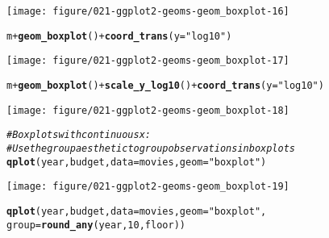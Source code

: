 \documentclass[a4paper,titlepage]{tufte-handout}\usepackage[]{graphicx}\usepackage[]{color}
\makeatletter
\def\maxwidth{ %
  \ifdim\Gin@nat@width>\linewidth
    \linewidth
  \else
    \Gin@nat@width
  \fi
}
\newcommand{\hlnum}[1]{\textcolor[rgb]{0.686,0.059,0.569}{#1}}%
\newcommand{\hlstr}[1]{\textcolor[rgb]{0.192,0.494,0.8}{#1}}%
\newcommand{\hlcom}[1]{\textcolor[rgb]{0.678,0.584,0.686}{\textit{#1}}}%
\newcommand{\hlopt}[1]{\textcolor[rgb]{0,0,0}{#1}}%
\newcommand{\hlstd}[1]{\textcolor[rgb]{0.345,0.345,0.345}{#1}}%
\newcommand{\hlkwc}[1]{\textcolor[rgb]{0.333,0.667,0.333}{#1}}%
\newcommand{\hlkwd}[1]{\textcolor[rgb]{0.737,0.353,0.396}{\textbf{#1}}}%
\newenvironment{kframe}{%
 \def\at@end@of@kframe{}%
 \ifinner\ifhmode%
  \def\at@end@of@kframe{\end{minipage}}%
  \begin{minipage}{\columnwidth}%
 \fi\fi%
 \def\FrameCommand##1{\hskip\@totalleftmargin \hskip-\fboxsep
 \colorbox{shadecolor}{##1}\hskip-\fboxsep
     \hskip-\linewidth \hskip-\@totalleftmargin \hskip\columnwidth}%
 \MakeFramed {\advance\hsize-\width
   \@totalleftmargin\z@ \linewidth\hsize
   \@setminipage}}%
 {\par\unskip\endMakeFramed%
 \at@end@of@kframe}
\newenvironment{knitrout}{}{} %
\makeatother
\begin{document}
\begin{knitrout}
\begin{kframe}
{\ttfamily\noindent\color{warningcolor}{\#\# Warning in loop\_apply(n, do.ply): position\_dodge requires constant width: output may be incorrect}}\end{kframe}
\texttt{[image: figure/021-ggplot2-geoms-geom\_boxplot-16]} 
\begin{kframe}\begin{alltt}
\hlstd{m} \hlopt{+} \hlkwd{geom_boxplot}\hlstd{()} \hlopt{+} \hlkwd{coord_trans}\hlstd{(}\hlkwc{y} \hlstd{=} \hlstr{"log10"}\hlstd{)}
\end{alltt}


{\ttfamily\noindent\color{warningcolor}{\#\# Warning in loop\_apply(n, do.ply): position\_dodge requires constant width: output may be incorrect}}\end{kframe}
\texttt{[image: figure/021-ggplot2-geoms-geom\_boxplot-17]} 
\begin{kframe}\begin{alltt}
\hlstd{m} \hlopt{+} \hlkwd{geom_boxplot}\hlstd{()} \hlopt{+} \hlkwd{scale_y_log10}\hlstd{()} \hlopt{+} \hlkwd{coord_trans}\hlstd{(}\hlkwc{y} \hlstd{=} \hlstr{"log10"}\hlstd{)}
\end{alltt}


{\ttfamily\noindent\color{warningcolor}{\#\# Warning in loop\_apply(n, do.ply): position\_dodge requires constant width: output may be incorrect}}\end{kframe}
\texttt{[image: figure/021-ggplot2-geoms-geom\_boxplot-18]} 
\begin{kframe}\begin{alltt}
\hlcom{# Boxplots with continuous x:}
\hlcom{# Use the group aesthetic to group observations in boxplots}
\hlkwd{qplot}\hlstd{(year, budget,} \hlkwc{data} \hlstd{= movies,} \hlkwc{geom} \hlstd{=} \hlstr{"boxplot"}\hlstd{)}
\end{alltt}


{\ttfamily\noindent\color{warningcolor}{\#\# Warning in loop\_apply(n, do.ply): Removed 53573 rows containing non-finite values (stat\_boxplot).}}\end{kframe}
\texttt{[image: figure/021-ggplot2-geoms-geom\_boxplot-19]} 
\begin{kframe}\begin{alltt}
\hlkwd{qplot}\hlstd{(year, budget,} \hlkwc{data} \hlstd{= movies,} \hlkwc{geom} \hlstd{=} \hlstr{"boxplot"}\hlstd{,}
  \hlkwc{group} \hlstd{=} \hlkwd{round_any}\hlstd{(year,} \hlnum{10}\hlstd{, floor))}
\end{alltt}



\end{kframe}
\end{knitrout}
\end{document}
